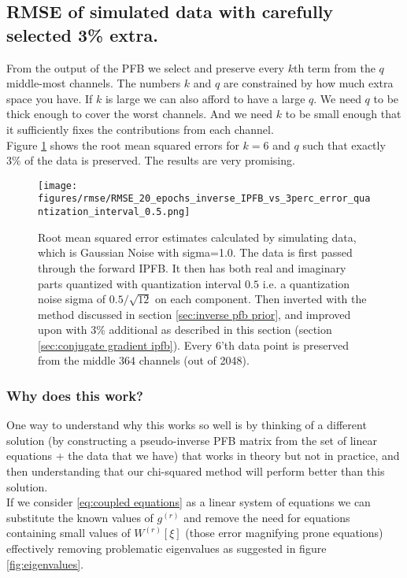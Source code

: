 \documentclass[12pt]{article}
\begin{document}
\subsection{RMSE of simulated data with carefully selected 3\% extra.}

From the output of the PFB we select and preserve every $k$th term from the $q$ middle-most channels. The numbers $k$ and $q$ are constrained by how much extra space you have. If $k$ is large we can also afford to have a large $q$. We need $q$ to be thick enough to cover the worst channels. And we need $k$ to be small enough that it sufficiently fixes the contributions from each channel. \\

Figure \ref{fig:rmse 20 epochs comparison} shows the root mean squared errors for $k=6$ and $q$ such that exactly $3\%$ of the data is preserved. The results are very promising. 

\begin{figure}[H]
    \centering
    \texttt{[image: figures/rmse/RMSE\_20\_epochs\_inverse\_IPFB\_vs\_3perc\_error\_quantization\_interval\_0.5.png]}
    \caption{Root mean squared error estimates calculated by simulating data, which is Gaussian Noise with sigma=1.0. The data is first passed through the forward IPFB. It then has both real and imaginary parts quantized with quantization interval $0.5$ i.e. a quantization noise sigma of $0.5/\sqrt{12}$ on each component. Then inverted with the method discussed in section \ref{sec:inverse pfb prior}, and improved upon with 3\% additional as described in this section (section \ref{sec:conjugate gradient ipfb}). Every 6'th data point is preserved from the middle $364$ channels (out of 2048).}
    \label{fig:rmse 20 epochs comparison}
\end{figure}

\subsubsection{Why does this work?}

One way to understand why this works so well is by thinking of a different solution (by constructing a pseudo-inverse PFB matrix from the set of linear equations + the data that we have) that works in theory but not in practice, and then understanding that our chi-squared method will perform better than this solution.\\

If we consider \eqref{eq:coupled equations} as a linear system of equations we can substitute the known values of $g^{(r)}$ and remove the need for equations containing small values of $W^{(r)}[\xi]$ (those error magnifying prone equations) effectively removing problematic eigenvalues as suggested in figure \ref{fig:eigenvalues}. \\ 
\end{document}
